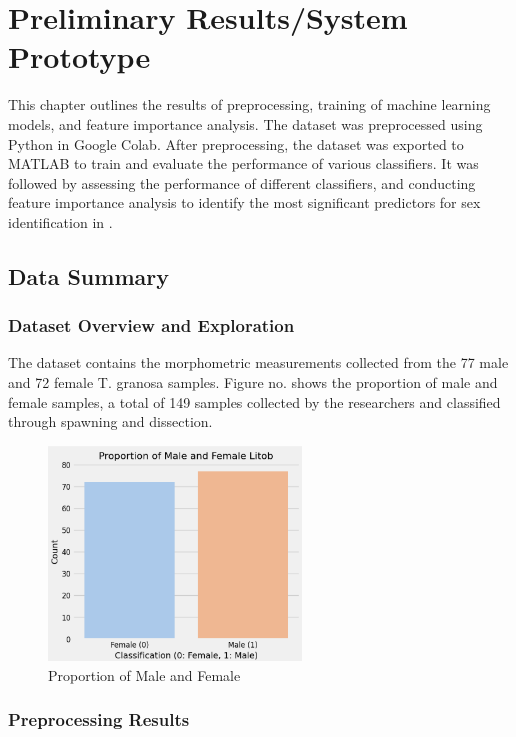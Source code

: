 

\chapter{Preliminary Results/System Prototype}
This chapter outlines the results of preprocessing, training of machine learning models, and feature importance analysis. The dataset was preprocessed using Python in Google Colab. After preprocessing, the dataset was exported to MATLAB to train and evaluate the performance of various classifiers. It was followed by assessing the performance of different classifiers, and conducting feature importance analysis to identify the most significant predictors for sex identification in \Tgranosa.

\section{Data Summary}
\subsection{Dataset Overview and Exploration}

The dataset contains the morphometric measurements collected from the 77 male and 72 female T. granosa samples. Figure no. shows the proportion of male and female samples, a total of 149 samples collected by the researchers and classified through spawning and dissection. 

\begin{figure}[!htbp]
	\centering
	\includegraphics[width=0.6\textwidth]{figures/test-train.png}
	\caption{Proportion of Male and Female \Tgranosa}
	\label{fig:test-train}
\end{figure}

\subsection{Preprocessing Results}


